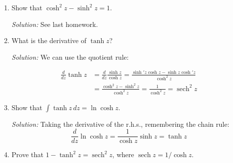 \documentclass[12pt]{article}
\DeclareMathOperator{\sech}{sech}
\newcommand{\soln}[1] {\textit{Solution:} #1}
\begin{document}
\begin{enumerate}
\begin{enumerate}
                \soln{
                  \begin{align*}
                    \cos(iz) = \frac{e^{iiz} + e^{-iiz}}{2} =
                    \frac{e^{-z} + e^{z}}{2} = \cosh z
                  \end{align*}

                  For sin/sinh, we can make the same guess:
                  \begin{align*}
                    \sin(iz) & = \frac{e^{iiz} - e^{-iiz}}{2i} =
                    \frac{e^{-z} - e^{z}}{2i}                    \\
                             & = \frac{e^{z} - e^{-z}}{-2i}      \\
                             & = \frac{1}{-i} \sinh z            \\
                             & = i \sinh z
                  \end{align*}
                  Or one can multiply the whole thing by $-i$ to get $\sinh z = -i \sin (iz)$.

                }
          \item Show that $\cosh^2 z - \sinh^2 z = 1$.

                \soln{See last homework.}

          \item What is the derivative of $\tanh z$?

                \soln{We can use the quotient rule:

                  \begin{align*}
                    \frac{d}{dz} \tanh z & = \frac{d}{dz}\frac{\sinh z}{\cosh z} = \frac{\sinh' z \cosh z - \sinh z \cosh' z}{\cosh^2 z} \\
                                         & =  \frac{\cosh^2 z - \sinh^2 z}{\cosh^2 z} = \frac{1}{\cosh^2 z} = \sech^2 z
                  \end{align*}
                }

          \item Show that $\int \tanh z \, dz = \ln\cosh z$.

                \soln{Taking the derivative of the r.h.s., remembering the chain rule:
                  $$\frac{d}{dz} \ln\cosh z = \frac{1}{\cosh z}\sinh z = \tanh z
                  $$}

          \item Prove that $1 - \tanh^2 z = \sech^2 z$, where $\sech z = 1/\cosh z$.


\end{enumerate}
\end{enumerate}
\end{document}
